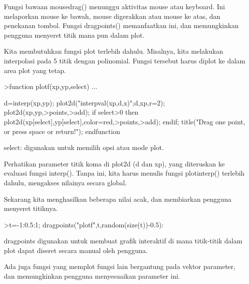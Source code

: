 \documentclass{article}
\begin{document}
\begin{eulernotebook}
\begin{eulercomment}
\begin{eulercomment}
\begin{eulercomment}
\begin{eulercomment}
\begin{eulercomment}
\begin{eulercomment}
\begin{eulercomment}
\begin{eulercomment}
\begin{eulercomment}
\begin{eulercomment}
\begin{eulercomment}
Fungsi bawaan mousedrag() menunggu aktivitas mouse atau keyboard. Ini
melaporkan mouse ke bawah, mouse digerakkan atau mouse ke atas, dan
penekanan tombol. Fungsi dragpoints() memanfaatkan ini, dan
memungkinkan pengguna menyeret titik mana pun dalam plot.

Kita membutuhkan fungsi plot terlebih dahulu. Misalnya, kita melakukan
interpolasi pada 5 titik dengan polinomial. Fungsi tersebut harus
diplot ke dalam area plot yang tetap.
\end{eulercomment}
\begin{eulerprompt}
>function plotf(xp,yp,select) ...
\end{eulerprompt}
\begin{eulerudf}
    d=interp(xp,yp);
    plot2d("interpval(xp,d,x)";d,xp,r=2);
    plot2d(xp,yp,>points,>add);
    if select>0 then
      plot2d(xp[select],yp[select],color=red,>points,>add);
    endif;
    title("Drag one point, or press space or return!");
  endfunction
\end{eulerudf}
\begin{eulercomment}
select: digunakan untuk memilih opsi atau mode plot.

Perhatikan parameter titik koma di plot2d (d dan xp), yang diteruskan
ke evaluasi fungsi interp(). Tanpa ini, kita harus menulis fungsi
plotinterp() terlebih dahulu, mengakses nilainya secara global.

Sekarang kita menghasilkan beberapa nilai acak, dan membiarkan
pengguna menyeret titiknya.
\end{eulercomment}
\begin{eulerprompt}
>t=-1:0.5:1; dragpoints("plotf",t,random(size(t))-0.5):
\end{eulerprompt}
\begin{eulercomment}
dragpoints digunakan untuk membuat grafik interaktif di mana
titik-titik dalam plot dapat diseret secara manual oleh pengguna.

Ada juga fungsi yang memplot fungsi lain bergantung pada vektor
parameter, dan memungkinkan pengguna menyesuaikan parameter ini.


\end{eulercomment}
\end{eulercomment}
\end{eulercomment}
\end{eulercomment}
\end{eulercomment}
\end{eulercomment}
\end{eulercomment}
\end{eulercomment}
\end{eulercomment}
\end{eulercomment}
\end{eulercomment}
\end{eulernotebook}
\end{document}

